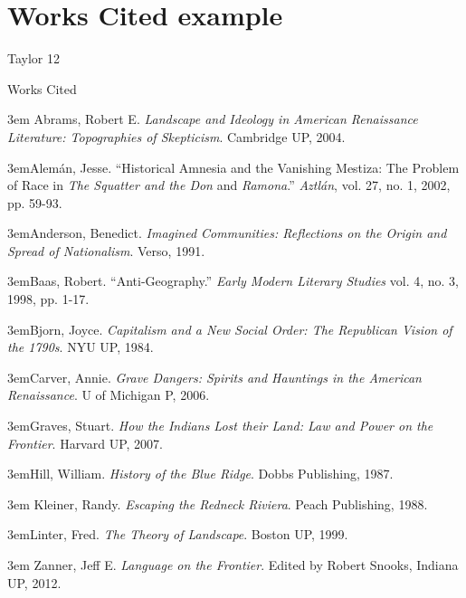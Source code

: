 \section{Works Cited example}

\bigskip

\begin{tcolorbox}[enhanced,width=4.2in,left=.3in, right=.3in,
   drop fuzzy shadow southeast,
   halign=flush left,
    boxrule=0.4pt,sharp corners,colframe=black!80!black,colback=white!10]

\medskip

{\scriptsize \begin{flushright} Taylor 12 \end{flushright}

\begin{doublespacing}
\begin{center}Works Cited \end{center}
\hangindent3em{
Abrams, Robert E. \emph{Landscape and Ideology in American Renaissance Literature: Topographies of Skepticism}. Cambridge UP, 2004.}

\hangindent3em{Alemán, Jesse. “Historical Amnesia and the Vanishing Mestiza: The Problem of Race in \emph{The Squatter and the Don} and \emph{Ramona}.” \emph{Aztlán}, vol. 27, no. 1, 2002, pp. 59-93.}

\hangindent3em{Anderson, Benedict. \emph{Imagined Communities: Reflections on the Origin and Spread of Nationalism}. Verso, 1991.}

\hangindent3em{Baas, Robert. “Anti-Geography.” \emph{Early Modern Literary Studies} vol. 4, no. 3, 1998, pp. 1-17.}

\hangindent3em{Bjorn, Joyce. \emph{Capitalism and a New Social Order: The Republican Vision of the 1790s}. NYU UP, 1984.}

\hangindent3em{Carver, Annie. \emph{Grave Dangers: Spirits and Hauntings in the American Renaissance}. U of Michigan P, 2006.}

\hangindent3em{Graves, Stuart. \emph{How the Indians Lost their Land: Law and Power on the Frontier}. Harvard UP, 2007.}

\hangindent3em{Hill, William. \emph{History of the Blue Ridge}. Dobbs Publishing, 1987.}

\hangindent3em{
Kleiner, Randy. \emph{Escaping the Redneck Riviera}. Peach Publishing, 1988.
}

\hangindent3em{Linter, Fred. \emph{The Theory of Landscape}. Boston UP, 1999.
}

\hangindent3em{
Zanner, Jeff E. \emph{Language on the Frontier}. Edited by Robert Snooks, Indiana UP, 2012.}

\end{doublespacing}}

\bigskip
\bigskip
\bigskip
\bigskip
\end{tcolorbox}



